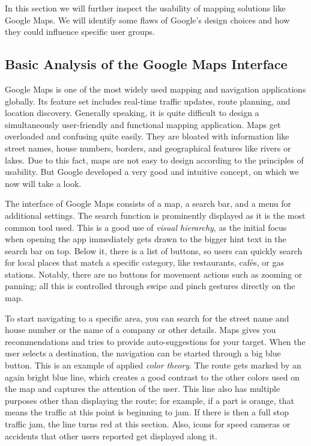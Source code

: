 \Author{\daAuthorTwo}

In this section we will further inspect the usability of mapping solutions like Google Maps. We will identify some flaws of Google's design choices and how they could influence specific user groups.

\subsection{Basic Analysis of the Google Maps Interface}

Google Maps is one of the most widely used mapping and navigation applications globally. Its feature set includes real-time traffic updates, route planning, and location discovery. Generally speaking, it is quite difficult to design a simultaneously user-friendly and functional mapping application. Maps get overloaded and confusing quite easily. They are bloated with information like street names, house numbers, borders, and geographical features like rivers or lakes. Due to this fact, maps are not easy to design according to the principles of usability. But Google developed a very good and intuitive concept, on which we now will take a look.

\blankLine

The interface of Google Maps consists of a map, a search bar, and a menu for additional settings. The search function is prominently displayed as it is the most common tool used. This is a good use of \textit{visual hierarchy}, as the initial focus when opening the app immediately gets drawn to the bigger hint text in the search bar on top. Below it, there is a list of buttons, so users can quickly search for local places that match a specific category, like restaurants, cafés, or gas stations. Notably, there are no buttons for movement actions such as zooming or panning; all this is controlled through swipe and pinch gestures directly on the map. \autocite{battersby2008user}

\blankLine

To start navigating to a specific area, you can search for the street name and house number or the name of a company or other details. Maps gives you recommendations and tries to provide auto-suggestions for your target. When the user selects a destination, the navigation can be started through a big blue button. This is an example of applied \textit{color theory}. The route gets marked by an again bright blue line, which creates a good contrast to the other colors used on the map and captures the attention of the user. This line also has multiple purposes other than displaying the route; for example, if a part is orange, that means the traffic at this point is beginning to jam. If there is then a full stop traffic jam, the line turns red at this section. Also, icons for speed cameras or accidents that other users reported get displayed along it.

